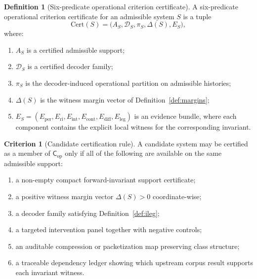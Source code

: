 \documentclass[11pt,a4paper]{article}
\theoremstyle{definition}
\newtheorem{definition}[theorem]{Definition}
\newtheorem{criterion}[theorem]{Criterion}
\newcommand{\Cop}{\mathsf{C}_{\mathrm{op}}}
\newcommand{\Aset}{A_S}
\newcommand{\Dec}{\mathscr{D}}
\begin{document}
\begin{definition}[Six-predicate operational criterion certificate]\label{def:cert}
A six-predicate operational criterion certificate for an admissible system $S$ is a tuple
\[
\mathrm{Cert}(S)=\bigl(\Aset,\Dec_S,\pi_S,\Delta(S),E_S\bigr),
\]
where:
\begin{enumerate}[leftmargin=1.5em]
\item $\Aset$ is a certified admissible support;
\item $\Dec_S$ is a certified decoder family;
\item $\pi_S$ is the decoder-induced operational partition on admissible histories;
\item $\Delta(S)$ is the witness margin vector of Definition~\ref{def:margins};
\item $E_S=(E_{\mathrm{per}},E_{\mathrm{ri}},E_{\mathrm{int}},E_{\mathrm{cont}},E_{\mathrm{diff}},E_{\mathrm{leg}})$ is an evidence bundle, where each component contains the explicit local witness for the corresponding invariant.
\end{enumerate}
\end{definition}

\begin{criterion}[Candidate certification rule]\label{crit:cert}
A candidate system may be certified as a member of $\Cop$ only if all of the following are available on the same admissible support:
\begin{enumerate}[leftmargin=1.5em]
\item a non-empty compact forward-invariant support certificate;
\item a positive witness margin vector $\Delta(S)>0$ coordinate-wise;
\item a decoder family satisfying Definition~\ref{def:ileg};
\item a targeted intervention panel together with negative controls;
\item an auditable compression or packetization map preserving class structure;
\item a traceable dependency ledger showing which upstream corpus result supports each invariant witness.
\end{enumerate}
\end{criterion}
\end{document}
